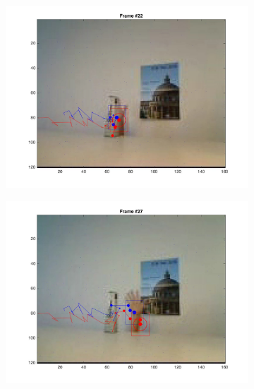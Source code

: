 \documentclass{ethz_report}
\begin{document}
\begin{figure}[h]
\begin{subfigure}[b]{.25\textwidth}
        \includegraphics[width=1\linewidth]{images/video2_noise_high_21}
    \end{subfigure}%
    \begin{subfigure}[b]{.25\textwidth}
        \centering
        \includegraphics[width=1\linewidth]{images/video2_noise_high_26}
    \end{subfigure}%
    \begin{subfigure}[b]{.25\textwidth}
        \centering

\end{subfigure}
\end{figure}
\end{document}
